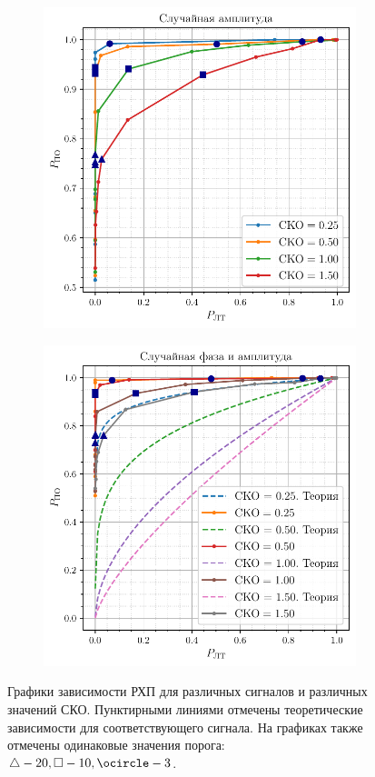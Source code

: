 \begin{figure}[H]
    \centering
    \begin{subfigure}{0.49\linewidth}
	    \includegraphics[width=\linewidth]{data/data_amplitude.pdf}
    \end{subfigure}
    \begin{subfigure}{0.49\linewidth}
	    \includegraphics[width=\linewidth]{data/data_phase_amplitude.pdf}
    \end{subfigure}
    \caption{Графики зависимости РХП для различных сигналов и различных значений СКО. Пунктирными линиями 
    отмечены теоретические зависимости для соответствующего сигнала.
    На графиках также отмечены одинаковые значения порога: $\triangle - 20, \square - 10, \ocircle - 3$.}
    \label{fig:task3}
\end{figure}



